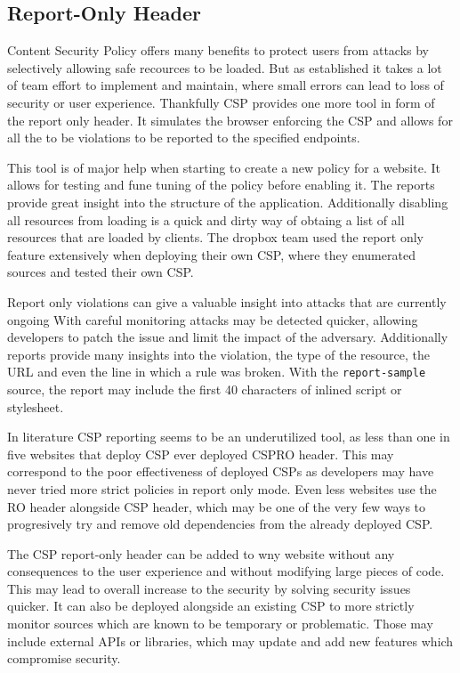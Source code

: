 \documentclass[11]{article}   %
\begin{document}
\subsection{Report-Only Header}
Content Security Policy offers many benefits to protect users from attacks by selectively allowing safe recources to be loaded.
But as established it takes a lot of team effort to implement and maintain, where small errors can lead to loss of security or user experience.
Thankfully CSP provides one more tool in form of the report only header.
It simulates the browser enforcing the CSP and allows for all the to be violations to be reported to the specified endpoints.

This tool is of major help when starting to create a new policy for a website.
It allows for testing and fune tuning of the policy before enabling it. 
The reports provide great insight into the structure of the application.
Additionally disabling all resources from loading is a quick and dirty way of obtaing a list of all resources that are loaded by clients.
The dropbox team used the report only feature extensively when deploying their own CSP, where they enumerated sources and tested their own CSP. \cite{dropboxcsp}


Report only violations can give a valuable insight into attacks that are currently ongoing 
With careful monitoring attacks may be detected quicker, allowing developers to patch the issue and limit the impact of the adversary.
Additionally reports provide many insights into the violation, the type of the resource, the URL and even the line in which a rule was broken.
With the \texttt{report-sample} source, the report may include the first 40 characters of inlined script or stylesheet.

In literature CSP reporting seems to be an underutilized tool, as less than one in five websites that deploy CSP ever deployed CSPRO header. \cite{osti_10173479}
This may correspond to the poor effectiveness of deployed CSPs as developers may have never tried more strict policies in report only mode.
Even less websites use the RO header alongside CSP header, which may be one of the very few ways to progresively try and remove old dependencies from the already deployed CSP.

The CSP report-only header can be added to wny website without any consequences to the user experience and without modifying large pieces of code.
This may lead to overall increase to the security by solving security issues quicker.
It can also be deployed alongside an existing CSP to more strictly monitor sources which are known to be temporary or problematic.
Those may include external APIs or libraries, which may update and add new features which compromise security.

\printbibliography


\end{document}

